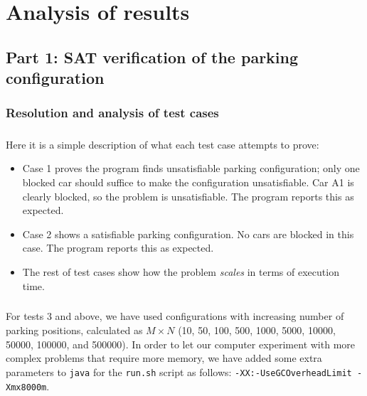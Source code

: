 \chapter{Analysis of results}
\label{chapter: analysis of results}









\section{Part 1: SAT verification of the parking configuration}

\subsection{Resolution and analysis of test cases}

\paragraph{}

\paragraph{}
Here it is a simple description of what each test case attempts to prove:
\begin{itemize}
  \item Case 1 proves the program finds unsatisfiable parking configuration; only one blocked car should suffice to make the configuration unsatisfiable. Car A1 is clearly blocked, so the problem is unsatisfiable. The program reports this as expected.
  \item Case 2 shows a satisfiable parking configuration. No cars are blocked in this case. The program reports this as expected.
  \item The rest of test cases show how the problem \textit{scales} in terms of execution time.
\end{itemize}

\paragraph{}
For tests 3 and above, we have used configurations with increasing number of parking positions, calculated as $M \times N$ (10, 50, 100, 500, 1000, 5000, 10000, 50000, 100000, and 500000). In order to let our computer experiment with more complex problems that require more memory, we have added some extra parameters to \texttt{java} for the \texttt{run.sh} script as follows: \texttt{-XX:-UseGCOverheadLimit -Xmx8000m}.

